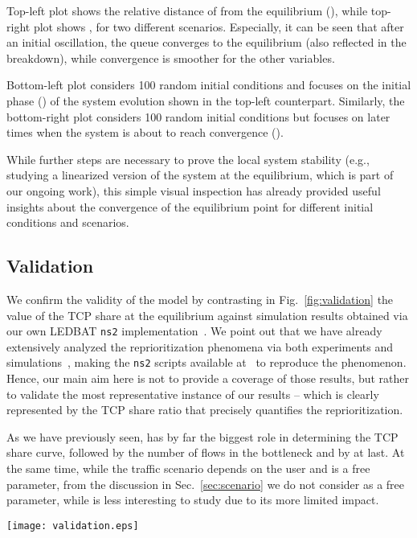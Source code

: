 \documentclass[conference]{IEEEtran}
\newcommand{\secR}[1]{Sec.~\ref{sec:#1}}
\newcommand{\secL}[1]{\label{sec:#1}}
\newcommand{\figR}[1]{Fig.~\ref{fig:#1}}
\newcommand{\figLC}[2]{
		\caption{#2}
		\label{fig:#1}
}
\begin{document}
Top-left plot shows the relative distance of  from the equilibrium (), while top-right plot shows , for two different scenarios. Especially, it can be seen that after an initial oscillation, the queue converges to the equilibrium (also reflected in the breakdown), while convergence is smoother for the other variables.

Bottom-left plot considers 100 random initial conditions and focuses on the initial phase ()  of the system evolution  shown in the top-left counterpart. Similarly, the bottom-right plot considers 100 random initial conditions but focuses on later times when the system is about to reach convergence ().

While further steps are necessary to prove the local system stability (e.g., studying a linearized version of the system at the equilibrium, which is part of our ongoing work), this simple visual inspection has already provided useful insights about the convergence of the equilibrium point for different initial conditions and scenarios.


\subsection{Validation}\secL{validation}

We confirm the validity of the model by contrasting in \figR{validation} the value  of the TCP share at the equilibrium against simulation results obtained via our own LEDBAT \verb!ns2! implementation~\cite{ledbat_code}. 
We point out that we have already extensively analyzed the reprioritization phenomena via both experiments and simulations~\cite{tma13}, making the \verb!ns2! scripts available at~\cite{ledbat_interaction} to reproduce the phenomenon. Hence, our main aim here is not to provide a coverage of those results, but rather to validate the most representative instance of our results -- which is clearly represented by the TCP share ratio that precisely quantifies the reprioritization.

As we have previously seen,  has by far the biggest role in determining the TCP share curve, followed by the number of flows in the bottleneck and by  at last. At the same time, while the traffic scenario depends on the user and is a free parameter, from the discussion in \secR{scenario} we do not consider  as a free parameter, while  is less interesting to study due to its more limited impact.




\begin{figure*}[t]
    \begin{center}
\texttt{[image: validation.eps]}
        \figLC{validation}{Simulation validation of TCP share ratio  at the equilibrium as a function of  for various traffic scenarios   .}
    \end{center}
\end{figure*}
\end{document}
